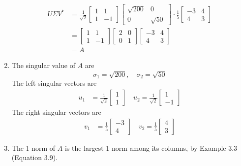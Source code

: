 \documentclass[12pt]{article}
\newenvironment{sol}[1][Solution]{\begin{trivlist}
		\item[\hskip \labelsep {\bfseries #1:}]}{\end{trivlist}}
\begin{document}
\begin{sol}
\begin{enumerate}[label=(\alph*)]
		\begin{align*}
			U\Sigma V^*&=\frac{1}{\sqrt{2}}\begin{bmatrix}
				1 & 1\\
				1 & -1
			\end{bmatrix}
			\begin{bmatrix}
				\sqrt{200} & 0\\
				0 & \sqrt{50}
			\end{bmatrix}
			\cdot \frac{1}{5}\begin{bmatrix}
				-3 & 4\\
				4 & 3
			\end{bmatrix}\\
		&=\begin{bmatrix}
			1 & 1\\
			1 & -1
		\end{bmatrix}
		\begin{bmatrix}
			2 & 0\\
			0 & 1
		\end{bmatrix}
		\begin{bmatrix}
			-3 & 4\\
			4 & 3
		\end{bmatrix}\\
		&=A
		\end{align*}
		\item The singular value of $A$ are
		\[
		\sigma_1=\sqrt{200},\quad \sigma_2=\sqrt{50}
		\]
		The left singular vectors are
		\begin{align*}
			u_1&=\frac{1}{\sqrt{2}}
			\begin{bmatrix}
				1\\
				1
			\end{bmatrix}
			\quad 
			u_2=\frac{1}{\sqrt{2}}
			\begin{bmatrix}
				1\\
				-1
			\end{bmatrix}
		\end{align*}
		The right singular vectors are
		\begin{align*}
			v_1&=\frac{1}{5}
			\begin{bmatrix}
				-3\\
				4
			\end{bmatrix}
			\quad 
			v_2=\frac{1}{5}
			\begin{bmatrix}
				4\\
				3
			\end{bmatrix}
		\end{align*}
		\item The 1-norm of $A$ is the largest 1-norm among its columns, by Example 3.3 (Equation 3.9).

\end{enumerate}
\end{sol}
\end{document}
